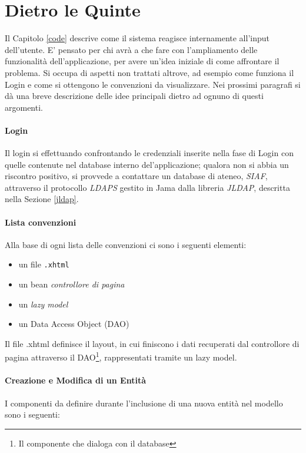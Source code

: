 \section{Dietro le Quinte}
Il Capitolo \ref{code} descrive come il sistema reagisce internamente all'input dell'utente. E' pensato per chi avrà a che fare con l'ampliamento delle funzionalità dell'applicazione, per avere un'idea iniziale di come affrontare il problema. Si occupa di aspetti non trattati altrove, ad esempio come funziona il Login e come si ottengono le convenzioni da visualizzare.
Nei prossimi paragrafi si dà una breve descrizione delle idee principali dietro ad ognuno di questi argomenti.

\paragraph{Login}
Il login si effettuando confrontando le credenziali inserite nella fase di Login con quelle contenute nel database interno del'applicazione; qualora non si abbia un riscontro positivo, si provvede a contattare un database di ateneo, \textsl{SIAF}, attraverso il protocollo \textsl{LDAPS} gestito in Jama dalla libreria \textsl{JLDAP}, descritta nella Sezione \ref{jldap}.

\paragraph{Lista convenzioni}
Alla base di ogni lista delle convenzioni ci sono i seguenti elementi:

\begin{itemize}
\item un file \texttt{.xhtml}
\item un bean \textsl{controllore di pagina}
\item un \textit{lazy model}
\item un Data Access Object (DAO)\newline
\end{itemize}

Il file .xhtml definisce il layout, in cui finiscono i dati recuperati dal controllore di pagina attraverso il DAO\footnote{Il componente che dialoga con il database}, rappresentati tramite un lazy model.

\paragraph{Creazione e Modifica di un Entità}
I componenti da definire durante l'inclusione di una nuova entità nel modello sono i seguenti:

